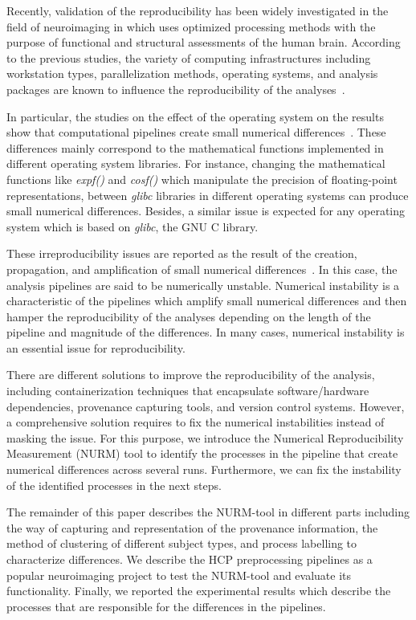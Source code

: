 \documentclass[a4paper,num-refs]{oup-contemporary}
\begin{document}
Recently, validation of the reproducibility has been widely investigated 
in the field of neuroimaging in which uses optimized 
processing methods with the purpose of functional and structural 
assessments of the human brain.
According to the previous 
studies, the variety of computing infrastructures including workstation 
types, parallelization methods, operating systems, and analysis 
packages are known to influence the reproducibility of the analyses~\cite{Gronenschild2012, 
diethelm2012limits, Glatard2015, bowring2019exploring}.

In particular, the studies on the effect of the operating system on the results show that 
computational pipelines create small numerical differences~\cite{Glatard2015, Scaria2017}.
These differences mainly correspond to the mathematical functions implemented 
in different operating system libraries.
For instance, changing the mathematical functions like \emph{expf()} and 
\emph{cosf()} which manipulate the precision of floating-point representations, 
between \emph{glibc} libraries in different operating systems can produce 
small numerical differences.
Besides, a similar issue is expected for any operating system which is 
based on \emph{glibc}, the GNU C library.

These irreproducibility issues are reported as the result of the 
creation, propagation, and amplification of small numerical 
differences~\cite{Gronenschild2012, diethelm2012limits, Glatard2015, 
bowring2019exploring}. In this case, the analysis pipelines are said to 
be numerically unstable. Numerical instability is a characteristic of 
the pipelines which amplify small numerical differences and then hamper 
the reproducibility of the analyses depending on the length of the 
pipeline and magnitude of the differences. In many cases, numerical 
instability is an essential issue for reproducibility.

There are different solutions to improve the reproducibility of the analysis, 
including containerization techniques that encapsulate software/hardware 
dependencies, provenance capturing tools, and version control systems. 
However, a comprehensive solution requires to fix the numerical 
instabilities instead of masking the issue. For this purpose, we introduce 
the Numerical Reproducibility Measurement (NURM) tool to identify the processes in 
the pipeline that create numerical differences across several runs. 
Furthermore, we can fix the instability of the identified processes 
in the next steps.

The remainder of this paper describes the NURM-tool in different parts 
including the way of capturing and representation of the provenance 
information, the method of clustering of different subject types, and 
process labelling to characterize differences. We describe the HCP 
preprocessing pipelines as a popular neuroimaging project to test the 
NURM-tool and evaluate its functionality. Finally, we reported the 
experimental results which describe the processes that are responsible 
for the differences in the pipelines.
\end{document}
